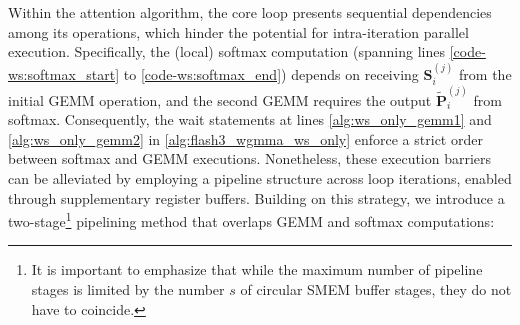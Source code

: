 Within the attention algorithm, the core loop presents sequential dependencies among its operations, which hinder the potential for intra-iteration parallel execution. Specifically, the (local) softmax computation (spanning lines \ref{code-ws:softmax_start} to \ref{code-ws:softmax_end}) depends on receiving $\mathbf{S}_i^{(j)}$ from the initial GEMM operation, and the second GEMM requires the output $\widetilde{\mathbf{P}}_i^{(j)}$ from softmax. Consequently, the wait statements at lines \ref{alg:ws_only_gemm1} and \ref{alg:ws_only_gemm2} in \cref{alg:flash3_wgmma_ws_only} enforce a strict order between softmax and GEMM executions. Nonetheless, these execution barriers can be alleviated by employing a pipeline structure across loop iterations, enabled through supplementary register buffers. Building on this strategy, we introduce a two-stage\footnote{It is important to emphasize that while the maximum number of pipeline stages is limited by the number $s$ of circular SMEM buffer stages, they do not have to coincide.} pipelining method that overlaps GEMM and softmax computations:

